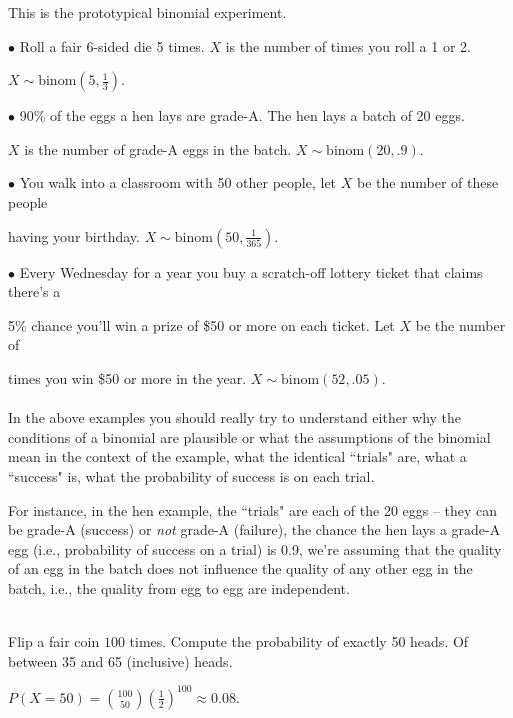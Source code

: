 \documentclass[12pt]{article}
\begin{document}
This is the prototypical binomial experiment.\medskip

\noindent $\bullet$ Roll a fair 6-sided die 5 times. $X$ is the number of times you roll a 1 or 2.

$X\sim \mbox{binom}(5,\frac 13)$.\medskip

\noindent $\bullet$ 90\% of the eggs a hen lays are grade-A.  The hen lays a batch of 20 eggs.

$X$ is the number of grade-A eggs in the batch.  $X\sim \mbox{binom}(20,.9)$.\medskip



\noindent $\bullet$ You walk into a classroom with 50 other people, let $X$ be the number of these people

having your birthday. $X\sim \mbox{binom}(50,\frac 1{365})$.\medskip


\noindent $\bullet$ Every Wednesday for a year you buy a scratch-off lottery ticket that claims there's a

5\% chance you'll win a prize of \$50 or more on each ticket.  Let $X$ be the number of

times you win \$50 or more in the year.  $X\sim \mbox{binom}(52,.05)$.\\




\\
In the above examples you should really try to understand either why the conditions of a binomial are plausible or what the assumptions of the binomial mean in the context of the example, what the identical ``trials" are, what a ``success" is, what the
probability of success is on each trial.\medskip

\noindent For instance, in the hen example, the ``trials" are each of the 20 eggs -- they can be grade-A (success) or {\em not} grade-A (failure), the chance the hen lays a grade-A egg (i.e., probability of success on a trial) is 0.9, we're assuming that the quality of an egg in the batch does not influence the quality of any other egg in the batch, i.e., the quality from egg to egg are independent.\\

\bigskip

\\
\noindent Flip a fair coin $100$ times.  Compute the probability of exactly 50 heads. Of between 35 and 65 (inclusive) heads.

$P(X=50) = {100\choose 50}\left(\frac 12\right)^{100} \approx 0.08.$
\end{document}
